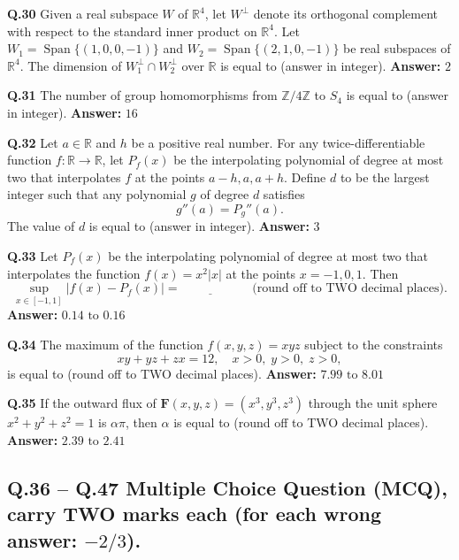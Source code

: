 \documentclass[11pt,a4paper]{article}
\newcommand{\ans}[1]{\textbf{Answer:} #1\par\medskip}
\begin{document}
\textbf{Q.30} Given a real subspace $W$ of $\mathbb{R}^4$, let $W^\perp$ denote its orthogonal complement with respect to the standard inner product on $\mathbb{R}^4$. Let $W_1 = \operatorname{Span}\{(1, 0, 0, -1)\}$ and $W_2 = \operatorname{Span}\{(2, 1, 0, -1)\}$ be real subspaces of $\mathbb{R}^4$. The dimension of $W_1^\perp \cap W_2^\perp$ over $\mathbb{R}$ is equal to \underline{\hspace{2cm}} (answer in integer).
\ans{$2$}

\textbf{Q.31} The number of group homomorphisms from $\mathbb{Z}/4\mathbb{Z}$ to $S_4$ is equal to \underline{\hspace{2cm}} (answer in integer).
\ans{$16$}

\textbf{Q.32} Let $a \in \mathbb{R}$ and $h$ be a positive real number. For any twice-differentiable function $f : \mathbb{R} \to \mathbb{R}$, let $P_f(x)$ be the interpolating polynomial of degree at most two that interpolates $f$ at the points $a - h, a, a + h$. Define $d$ to be the largest integer such that any polynomial $g$ of degree $d$ satisfies
\[
  g''(a) = P_g''(a).
\]
The value of $d$ is equal to \underline{\hspace{2cm}} (answer in integer).
\ans{$3$}

\textbf{Q.33} Let $P_f(x)$ be the interpolating polynomial of degree at most two that interpolates the function $f(x) = x^2|x|$ at the points $x = -1, 0, 1$. Then
\[
  \sup_{x \in [-1, 1]} |f(x) - P_f(x)| = \underline{\hspace{2cm}} \quad \text{(round off to TWO decimal places)}.
\]
\ans{$0.14 \text{ to } 0.16$}

\textbf{Q.34} The maximum of the function $f(x, y, z) = xyz$ subject to the constraints
\[
  xy + yz + zx = 12, \quad x > 0, \; y > 0, \; z > 0,
\]
is equal to \underline{\hspace{2cm}} (round off to TWO decimal places).
\ans{$7.99 \text{ to } 8.01$}

\textbf{Q.35} If the outward flux of $\mathbf{F}(x, y, z) = (x^3, y^3, z^3)$ through the unit sphere $x^2 + y^2 + z^2 = 1$ is $\alpha\pi$, then $\alpha$ is equal to \underline{\hspace{2cm}} (round off to TWO decimal places).
\ans{$2.39 \text{ to } 2.41$}

\subsection*{Q.36 -- Q.47 Multiple Choice Question (MCQ), carry TWO marks each (for each wrong answer: $-2/3$).}
\end{document}
